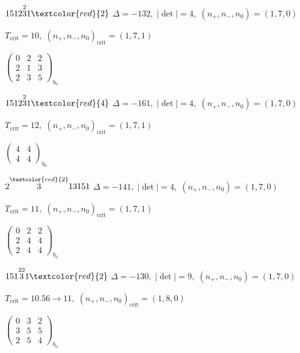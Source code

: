 \documentclass[10pt]{article}
\begin{document}
\smallskip

$1512\overset{2}{3}1\textcolor{red}{2}$ \quad $\Delta=-132,\; |\det|=4,\; (n_+,n_-,n_0)=(1,7,0)$

\hspace{1em}$T_{\text{crit}}=10,\; (n_+,n_-,n_0)_{\text{crit}}=(1,7,1)$

\hspace{2em}$\left(\begin{smallmatrix}0 & 2 & 2 \\ 2 & 1 & 3 \\ 2 & 3 & 5\end{smallmatrix}\right)_{\!b_0}$

$1512\overset{2}{3}1\textcolor{red}{4}$ \quad $\Delta=-161,\; |\det|=4,\; (n_+,n_-,n_0)=(1,7,0)$

\hspace{1em}$T_{\text{crit}}=12,\; (n_+,n_-,n_0)_{\text{crit}}=(1,7,1)$

\hspace{2em}$\left(\begin{smallmatrix}4 & 4 \\ 4 & 4\end{smallmatrix}\right)_{\!b_0}$

\smallskip

$2\overset{\textcolor{red}{2}}{3}13151$ \quad $\Delta=-141,\; |\det|=4,\; (n_+,n_-,n_0)=(1,7,0)$

\hspace{1em}$T_{\text{crit}}=11,\; (n_+,n_-,n_0)_{\text{crit}}=(1,7,1)$

\hspace{2em}$\left(\begin{smallmatrix}0 & 2 & 2 \\ 2 & 4 & 4 \\ 2 & 4 & 4\end{smallmatrix}\right)_{\!b_0}$

\smallskip

$151\overset{22}{3}1\textcolor{red}{2}$ \quad $\Delta=-130,\; |\det|=9,\; (n_+,n_-,n_0)=(1,7,0)$

\hspace{1em}$T_{\text{crit}}=10.56 \to 11,\; (n_+,n_-,n_0)_{\text{crit}}=(1,8,0)$

\hspace{2em}$\left(\begin{smallmatrix}0 & 3 & 2 \\ 3 & 5 & 5 \\ 2 & 5 & 4\end{smallmatrix}\right)_{\!b_0}$
\end{document}
